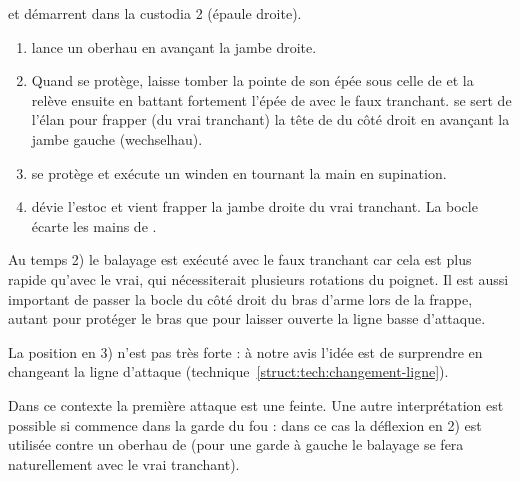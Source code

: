 \begin{technique}[Liegniczer 3]
\A et \D démarrent dans la custodia 2 (épaule droite).

\begin{enumerate}
	\item \A lance un oberhau en avançant la jambe droite.
	
	\item Quand \D se protège, \A laisse tomber la pointe de son épée sous celle de \D et la relève ensuite en battant fortement l'épée de \D avec le faux tranchant.
		\A se sert de l'élan pour frapper (du vrai tranchant) la tête de \D du côté droit en avançant la jambe gauche (wechselhau).
	
	\item \D se protège et \A exécute un winden en tournant la main en supination.
	
	\item {}
		\D dévie l'estoc et \A vient frapper la jambe droite du vrai tranchant.
		La bocle écarte les mains de \D.
\end{enumerate}

Au temps 2) le balayage est exécuté avec le faux tranchant car cela est plus rapide qu'avec le vrai, qui nécessiterait plusieurs rotations du poignet.
Il est aussi important de passer la bocle du côté droit du bras d'arme lors de la frappe, autant pour protéger le bras que pour laisser ouverte la ligne basse d'attaque.

La position en 3) n'est pas très forte : à notre avis l'idée est de surprendre en changeant la ligne d'attaque (technique~\ref{struct:tech:changement-ligne}).

Dans ce contexte la première attaque est une feinte.
Une autre interprétation est possible si \A commence dans la garde du fou : dans ce cas la déflexion en 2) est utilisée contre un oberhau de \D (pour une garde à gauche le balayage se fera naturellement avec le vrai tranchant).

\end{technique}


